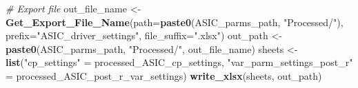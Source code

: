 \documentclass[
]{article}
\newenvironment{Shaded}{\begin{snugshade}}{\end{snugshade}}
\newcommand{\AttributeTok}[1]{\textcolor[rgb]{0.13,0.29,0.53}{#1}}
\newcommand{\CommentTok}[1]{\textcolor[rgb]{0.56,0.35,0.01}{\textit{#1}}}
\newcommand{\FunctionTok}[1]{\textcolor[rgb]{0.13,0.29,0.53}{\textbf{#1}}}
\newcommand{\NormalTok}[1]{#1}
\newcommand{\OtherTok}[1]{\textcolor[rgb]{0.56,0.35,0.01}{#1}}
\newcommand{\StringTok}[1]{\textcolor[rgb]{0.31,0.60,0.02}{#1}}
\begin{document}
\begin{Shaded}
\begin{Highlighting}[]
\CommentTok{\# Export file}
\NormalTok{out\_file\_name }\OtherTok{\textless{}{-}} \FunctionTok{Get\_Export\_File\_Name}\NormalTok{(}\AttributeTok{path=}\FunctionTok{paste0}\NormalTok{(ASIC\_parms\_path, }\StringTok{"Processed/"}\NormalTok{), }
                                      \AttributeTok{prefix=}\StringTok{"ASIC\_driver\_settings"}\NormalTok{, }
                                      \AttributeTok{file\_suffix=}\StringTok{".xlsx"}\NormalTok{)}
\NormalTok{out\_path }\OtherTok{\textless{}{-}} \FunctionTok{paste0}\NormalTok{(ASIC\_parms\_path, }\StringTok{"Processed/"}\NormalTok{, out\_file\_name)}
\NormalTok{sheets }\OtherTok{\textless{}{-}} \FunctionTok{list}\NormalTok{(}\StringTok{"cp\_settings"} \OtherTok{=}\NormalTok{ processed\_ASIC\_cp\_settings, }
               \StringTok{"var\_parm\_settings\_post\_r"} \OtherTok{=}\NormalTok{ processed\_ASIC\_post\_r\_var\_settings)}
\FunctionTok{write\_xlsx}\NormalTok{(sheets, out\_path)}
\end{Highlighting}
\end{Shaded}
\end{document}
